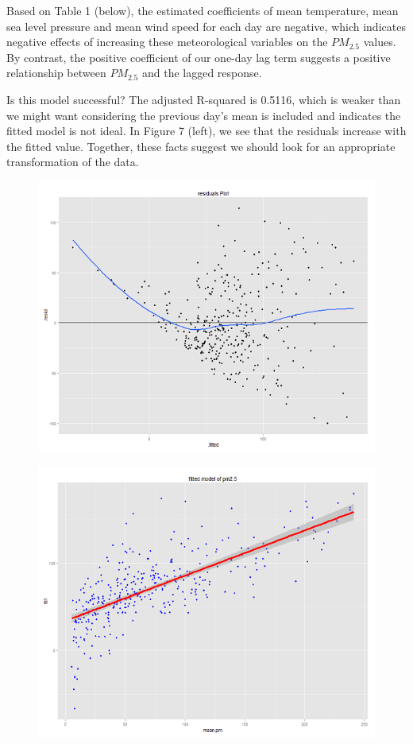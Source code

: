 \documentclass[11pt]{article} %
\begin{document}
Based on Table 1 (below), the estimated coefficients of 
mean temperature, mean sea level pressure and mean wind speed for each day are negative, 
which indicates negative effects of increasing these
meteorological variables on the \(PM_{2.5}\) values. 
By contrast, the positive coefficient of our one-day lag term suggests a positive relationship between
\(PM_{2.5}\) and the lagged response.

Is this model successful? The adjusted R-squared is 0.5116, which is weaker than we might want considering the previous day's mean is included and indicates the fitted model is not ideal. 
In Figure 7 (left), we see that the residuals increase with the fitted value. Together, these facts suggest we should look for an appropriate transformation of the data.

\begin{figure}
\centering
\begin{minipage}{.5\textwidth}
  \centering
  \includegraphics[width=\linewidth]{Figure2-2}
  \label{fig:test1}
\end{minipage}%
\begin{minipage}{.5\textwidth}
  \centering
  \includegraphics[width=\linewidth]{Figure2-3}

\end{minipage}
\end{figure}
\end{document}
